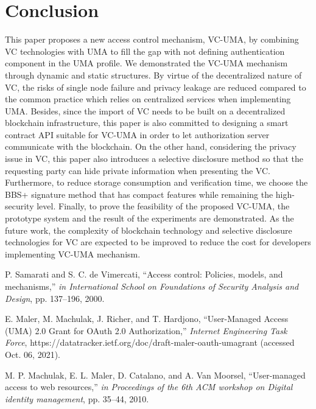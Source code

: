 \documentclass[conference, dvipdfmx]{IEEEtran} %
\begin{document}
\begin{sloppypar}
\section{Conclusion}
\label{sec:Conclusion}
This paper proposes a new access control mechanism, VC-UMA, by combining VC technologies with UMA to fill the gap with not defining authentication component in the UMA profile. We demonstrated the VC-UMA mechanism through dynamic and static structures.
By virtue of the decentralized nature of VC, the risks of single node failure and privacy leakage are reduced compared to the common practice which relies on centralized services when implementing UMA.
Besides, since the import of VC needs to be built on a decentralized blockchain infrastructure, this paper is also committed to designing a smart contract API suitable for VC-UMA in order to let authorization server communicate with the blockchain.
On the other hand, considering the privacy issue in VC, this paper also introduces a selective disclosure method so that the requesting party can hide private information when presenting the VC.
Furthermore, to reduce storage consumption and verification time, we choose the BBS+ signature method that has compact features while remaining the high-security level.
Finally, to prove the feasibility of the proposed VC-UMA, the prototype system and the result of the experiments are demonstrated.
As the future work, the complexity of blockchain technology and selective disclosure technologies for VC are expected to be improved to reduce the cost for developers implementing VC-UMA mechanism.





\begin{thebibliography}{00}
    P. Samarati and S. C. de Vimercati, ``Access control: Policies, models, and mechanisms,'' {\em in International School on Foundations of Security Analysis and Design}, pp. 137–196, 2000.
  
    E. Maler, M. Machulak, J. Richer, and T. Hardjono, ``User-Managed Access (UMA) 2.0 Grant for OAuth 2.0 Authorization,'' {\em Internet Engineering Task Force}, https://datatracker.ietf.org/doc/draft-maler-oauth-umagrant (accessed Oct. 06, 2021).
  
    M. P. Machulak, E. L. Maler, D. Catalano, and A. Van Moorsel, ``User-managed access to web resources,'' {\em in Proceedings of the 6th ACM workshop on Digital identity management}, pp. 35–44, 2010.
  

\end{thebibliography}
\end{sloppypar}
\end{document}

